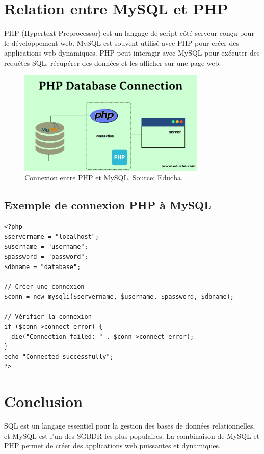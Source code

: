 \documentclass{article}
\begin{document}
\break\section{Relation entre MySQL et PHP}
PHP (Hypertext Preprocessor) est un langage de script côté serveur conçu pour le développement web. MySQL est souvent utilisé avec PHP pour créer des applications web dynamiques. PHP peut interagir avec MySQL pour exécuter des requêtes SQL, récupérer des données et les afficher sur une page web.

\begin{figure}[H]
  \centering
  \includegraphics[width=0.8\textwidth]{img/PHP-Database-Connection.png}
  \caption{Connexion entre PHP et MySQL. Source: \href{https://www.educba.com/php-database-connection/}{Educba}.}
  \label{fig:php-mysql-image}
\end{figure}

\subsection{Exemple de connexion PHP à MySQL}
\begin{verbatim}
<?php
$servername = "localhost";
$username = "username";
$password = "password";
$dbname = "database";

// Créer une connexion
$conn = new mysqli($servername, $username, $password, $dbname);

// Vérifier la connexion
if ($conn->connect_error) {
  die("Connection failed: " . $conn->connect_error);
}
echo "Connected successfully";
?>
\end{verbatim}

\section{Conclusion}
SQL est un langage essentiel pour la gestion des bases de données relationnelles, et MySQL est l'un des SGBDR les plus populaires. La combinaison de MySQL et PHP permet de créer des applications web puissantes et dynamiques.

\printbibliography
\end{document}
